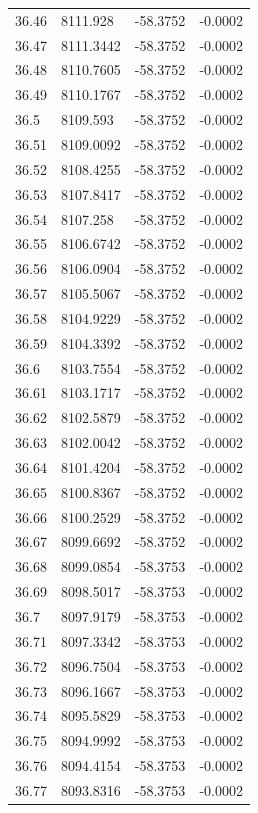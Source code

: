 \begin{table}[H]
\begin{tabular}{llll}
36.46 & 8111.928 & -58.3752 & -0.0002 \\
36.47 & 8111.3442 & -58.3752 & -0.0002 \\
36.48 & 8110.7605 & -58.3752 & -0.0002 \\
36.49 & 8110.1767 & -58.3752 & -0.0002 \\
36.5 & 8109.593 & -58.3752 & -0.0002 \\
36.51 & 8109.0092 & -58.3752 & -0.0002 \\
36.52 & 8108.4255 & -58.3752 & -0.0002 \\
36.53 & 8107.8417 & -58.3752 & -0.0002 \\
36.54 & 8107.258 & -58.3752 & -0.0002 \\
36.55 & 8106.6742 & -58.3752 & -0.0002 \\
36.56 & 8106.0904 & -58.3752 & -0.0002 \\
36.57 & 8105.5067 & -58.3752 & -0.0002 \\
36.58 & 8104.9229 & -58.3752 & -0.0002 \\
36.59 & 8104.3392 & -58.3752 & -0.0002 \\
36.6 & 8103.7554 & -58.3752 & -0.0002 \\
36.61 & 8103.1717 & -58.3752 & -0.0002 \\
36.62 & 8102.5879 & -58.3752 & -0.0002 \\
36.63 & 8102.0042 & -58.3752 & -0.0002 \\
36.64 & 8101.4204 & -58.3752 & -0.0002 \\
36.65 & 8100.8367 & -58.3752 & -0.0002 \\
36.66 & 8100.2529 & -58.3752 & -0.0002 \\
36.67 & 8099.6692 & -58.3752 & -0.0002 \\
36.68 & 8099.0854 & -58.3753 & -0.0002 \\
36.69 & 8098.5017 & -58.3753 & -0.0002 \\
36.7 & 8097.9179 & -58.3753 & -0.0002 \\
36.71 & 8097.3342 & -58.3753 & -0.0002 \\
36.72 & 8096.7504 & -58.3753 & -0.0002 \\
36.73 & 8096.1667 & -58.3753 & -0.0002 \\
36.74 & 8095.5829 & -58.3753 & -0.0002 \\
36.75 & 8094.9992 & -58.3753 & -0.0002 \\
36.76 & 8094.4154 & -58.3753 & -0.0002 \\
36.77 & 8093.8316 & -58.3753 & -0.0002 \\

\end{tabular}
\end{table}
